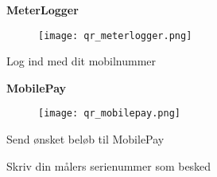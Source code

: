 \documentclass[11pt]{article}
\begin{document}
\thispagestyle{empty}

\textsf{{\fontsize{50}{60}\selectfont \textbf{MeterLogger}}}

\textsf{\varinfo}


\begin{figure}[H]
\texttt{[image: qr\_meterlogger.png]}
\end{figure}

\textsf{Log ind med dit mobilnummer \varsms}

\newpage

\textsf{{\fontsize{50}{60}\selectfont \textbf{MobilePay}}}

\begin{figure}[H]
\texttt{[image: qr\_mobilepay.png]}
\end{figure}

\textsf{Send ønsket beløb til MobilePay \varmobilepay}

\textsf{Skriv din målers serienummer \varserial} \textsf{som besked}
\end{document}
